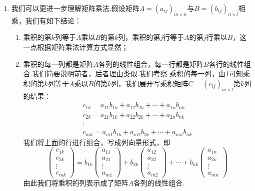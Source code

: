 \begin{enumerate}
    \item 我们可以更进一步理解矩阵乘法.假设矩阵$A=(a_{ij})_{m\times n}$与$B=(b_{ij})_{n\times l}$相乘，我们有如下结论：
    \begin{enumerate}[label=(\arabic*)]
        \item 乘积的第$k$列等于$A$乘以$B$的第$k$列，乘积的第$j$行等于$A$的第$j$行乘以$B$，这一点根据矩阵乘法计算方式显然；
        \item 乘积的每一列都是矩阵$A$各列的线性组合，每一行都是矩阵$B$各行的线性组合.我们简要说明前者，后者理由类似.我们考察
        乘积的每一列，由1可知乘积的第$k$列等于$A$乘以$B$的第$k$列，我们展开写乘积矩阵$C=(c_{ij})_{m\times l}$第$k$列的结果：
        \begin{gather*}
            c_{1k}=a_{11}b_{1k}+a_{12}b_{2k}+\cdots+a_{1n}b_{nk} \\
            c_{2k}=a_{21}b_{1k}+a_{22}b_{2k}+\cdots+a_{2n}b_{nk} \\
            \vdots \\
            c_{mk}=a_{m1}b_{1k}+a_{m2}b_{2k}+\cdots+a_{mn}b_{nk}
        \end{gather*}
        我们将上面的行进行组合，写成列向量形式，即
        \[\begin{pmatrix}
            c_{1k} \\ c_{2k} \\ \vdots \\ c_{mk}
        \end{pmatrix}=b_{1k}\begin{pmatrix}
            a_{11} \\ a_{21} \\ \vdots \\ a_{m1}
        \end{pmatrix}+b_{2k}\begin{pmatrix}
            a_{12} \\ a_{22} \\ \vdots \\ a_{m2}
        \end{pmatrix}+\cdots+b_{nk}\begin{pmatrix}
            a_{1n} \\ a_{2n} \\ \vdots \\ a_{mn}
        \end{pmatrix}\]
        由此我们将乘积的列表示成了矩阵$A$各列的线性组合.
    \end{enumerate}


\end{enumerate}
